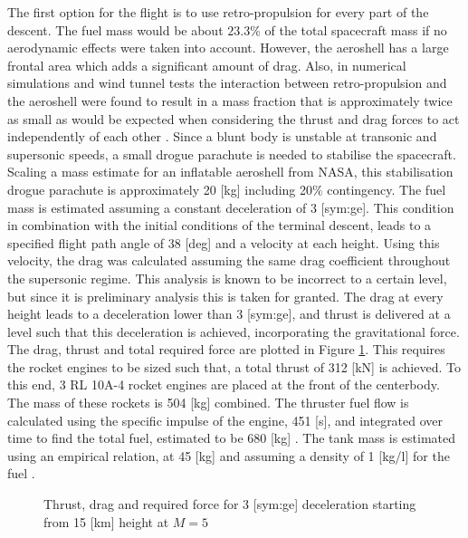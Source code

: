 The first option for the flight is to use retro-propulsion for every part of the descent. The fuel mass would be about $23.3\%$ of the total spacecraft mass if no aerodynamic effects were taken into account. However, the aeroshell has a large frontal area which adds a significant amount of drag. Also, in numerical simulations and wind tunnel tests the interaction between retro-propulsion and the aeroshell were found to result in a mass fraction that is approximately twice as small as would be expected when considering the thrust and drag forces to act independently of each other \cite{Korzun2009}. Since a blunt body is unstable at transonic and supersonic speeds, a small drogue parachute is needed to stabilise the spacecraft. Scaling a mass estimate for an inflatable aeroshell from NASA, this stabilisation drogue parachute is approximately 20 [kg] including 20$\%$ contingency.
The fuel mass is estimated assuming a constant deceleration of 3 [\gls{sym:ge}]. This condition in combination with the initial conditions of the terminal descent, leads to a specified flight path angle of 38 [deg] and a velocity at each height. Using this velocity, the drag was calculated assuming the same drag coefficient throughout the supersonic regime. This analysis is known to be incorrect to a certain level, but since it is preliminary analysis this is taken for granted. The drag at every height leads to a deceleration lower than 3 [\gls{sym:ge}], and thrust is delivered at a level such that this deceleration is achieved, incorporating the gravitational force. The drag, thrust and total required force are plotted in Figure \ref{fig:TDforce}. This requires the rocket engines to be sized such that, a total thrust of 312 [kN] is achieved. To this end, 3 RL 10A-4 rocket engines are placed at the front of the centerbody. The mass of these rockets is 504 [kg] combined. The thruster fuel flow is calculated using the specific impulse of the engine, 451 [s], and integrated over time to find the total fuel, estimated to be 680 [kg] \cite{Wertz2011}. The tank mass is estimated using an empirical relation, at 45 [kg] and assuming a density of 1 [kg/l] for the fuel \cite{Wertz2011}.

\begin{figure}
	\centering
	\setlength{} 
	\setlength{}
	
	\caption{Thrust, drag and required force for 3 [\gls{sym:ge}] deceleration starting from 15 [km] height at $M=5$}
	\label{fig:TDforce}
\end{figure}


